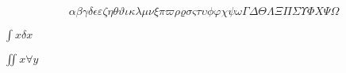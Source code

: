 \documentclass{article}
\begin{document}
\begin{equation}
  αβγδϵεζηθϑικλμνξπϖρϱσςτυϕφχψωΓΔΘΛΞΠΣΥΦΧΨΩ
\end{equation}

$\int x \delta x$

$∬ x ∀ y$
\end{document}
